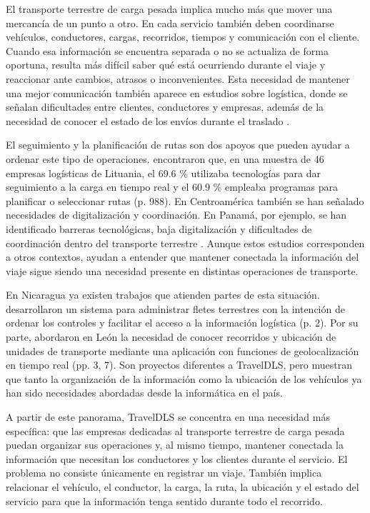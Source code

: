 El transporte terrestre de carga pesada implica mucho más que mover una mercancía de un punto a otro. En cada servicio también deben coordinarse vehículos, conductores, cargas, recorridos, tiempos y comunicación con el cliente. Cuando esa información se encuentra separada o no se actualiza de forma oportuna, resulta más difícil saber qué está ocurriendo durante el viaje y reaccionar ante cambios, atrasos o inconvenientes. Esta necesidad de mantener una mejor comunicación también aparece en estudios sobre logística, donde se señalan dificultades entre clientes, conductores y empresas, además de la necesidad de conocer el estado de los envíos durante el traslado \parencite[p. 2]{sultan2022real}.

El seguimiento y la planificación de rutas son dos apoyos que pueden ayudar a ordenar este tipo de operaciones. \textcite{pauzuoliene2024smart} encontraron que, en una muestra de 46 empresas logísticas de Lituania, el 69.6 \% utilizaba tecnologías para dar seguimiento a la carga en tiempo real y el 60.9 \% empleaba programas para planificar o seleccionar rutas (p. 988). En Centroamérica también se han señalado necesidades de digitalización y coordinación. En Panamá, por ejemplo, se han identificado barreras tecnológicas, baja digitalización y dificultades de coordinación dentro del transporte terrestre \parencite[p. 10]{castillo2025potenciando}. Aunque estos estudios corresponden a otros contextos, ayudan a entender que mantener conectada la información del viaje sigue siendo una necesidad presente en distintas operaciones de transporte.

En Nicaragua ya existen trabajos que atienden partes de esta situación. \textcite{aragon2018implementacion} desarrollaron un sistema para administrar fletes terrestres con la intención de ordenar los controles y facilitar el acceso a la información logística (p. 2). Por su parte, \textcite{garcia2022desarrollo} abordaron en León la necesidad de conocer recorridos y ubicación de unidades de transporte mediante una aplicación con funciones de geolocalización en tiempo real (pp. 3, 7). Son proyectos diferentes a TravelDLS, pero muestran que tanto la organización de la información como la ubicación de los vehículos ya han sido necesidades abordadas desde la informática en el país.

A partir de este panorama, TravelDLS se concentra en una necesidad más específica: que las empresas dedicadas al transporte terrestre de carga pesada puedan organizar sus operaciones y, al mismo tiempo, mantener conectada la información que necesitan los conductores y los clientes durante el servicio. El problema no consiste únicamente en registrar un viaje. También implica relacionar el vehículo, el conductor, la carga, la ruta, la ubicación y el estado del servicio para que la información tenga sentido durante todo el recorrido.

